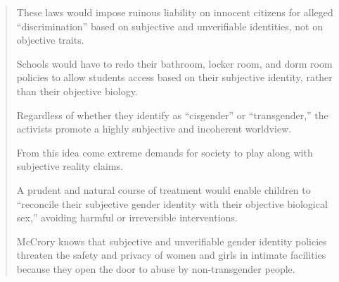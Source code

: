 \documentclass[11pt]{article}
\begin{document}
\begin{quote}
These laws would impose ruinous liability on innocent citizens for alleged “discrimination” based on subjective and unverifiable identities, not on objective traits.

Schools would have to redo their bathroom, locker room, and dorm room policies to allow students access based on their subjective identity, rather than their objective biology.

Regardless of whether they identify as “cisgender” or “transgender,” the activists promote a highly subjective and incoherent worldview.

From this idea come extreme demands for society to play along with subjective reality claims.

A prudent and natural course of treatment would enable children to “reconcile their subjective gender identity with their objective biological sex,” avoiding harmful or irreversible interventions.

McCrory knows that subjective and unverifiable gender identity policies threaten the safety and privacy of women and girls in intimate facilities because they open the door to abuse by non-transgender people.
\end{quote}
\end{document}
